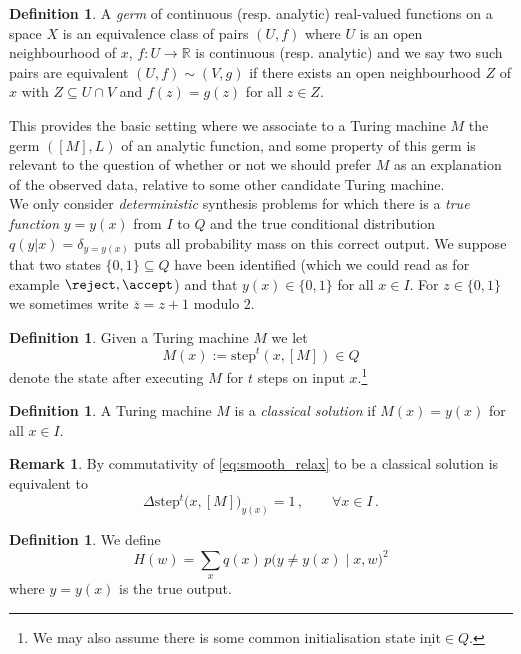 \documentclass[english,letter paper,12pt,reqno]{article}
\theoremstyle{definition}
\newtheorem{definition}[theorem]{Definition}
\newtheorem{remark}[theorem]{Remark}
\newcommand{\lto}{\longrightarrow}
\begin{document}
\begin{definition}\label{defn:germ}
A \emph{germ} of continuous (resp. analytic) real-valued functions on a space $X$ is an equivalence class of pairs $(U, f)$ where $U$ is an open neighbourhood of $x$, $f: U \lto \mathbb{R}$ is continuous (resp. analytic) and we say two such pairs are equivalent $(U, f) \sim (V, g)$ if there exists an open neighbourhood $Z$ of $x$ with $Z \subseteq U \cap V$ and $f(z) = g(z)$ for all $z \in Z$.
\end{definition}

This provides the basic setting where we associate to a Turing machine $M$ the germ $([M], L)$ of an analytic function, and some property of this germ is relevant to the question of whether or not we should prefer $M$ as an explanation of the observed data, relative to some other candidate Turing machine.
\\

We only consider \emph{deterministic} synthesis problems for which there is a \emph{true function} $y = y(x)$ from $I$ to $Q$ and the true conditional distribution $q(y|x) = \delta_{y = y(x)}$ puts all probability mass on this correct output. We suppose that two states $\{ 0, 1\} \subseteq Q$ have been identified (which we could read as for example $\reject, \accept$) and that $y(x) \in \{0,1\}$ for all $x \in I$. For $z \in \{0,1\}$ we sometimes write $\overline{z} = z + 1$ modulo $2$. 

\begin{definition}
Given a Turing machine $M$ we let
\[
M(x) := \textrm{step}^t(x,[M]) \in Q
\]
denote the state after executing $M$ for $t$ steps on input $x$.\footnote{We may also assume there is some common initialisation state $\underline{\text{init}} \in Q$.}
\end{definition}

\begin{definition} A Turing machine $M$ is a \emph{classical solution} if $M(x) = y(x)$ for all $x \in I$.
\end{definition}

\begin{remark} By commutativity of \eqref{eq:smooth_relax} to be a classical solution is equivalent to
\[
\Delta\textrm{step}^t\big(x,[M]\big)_{y(x)} = 1\,, \qquad \forall x \in I\,.
\]
\end{remark}

\begin{definition}\label{definition:polynomial_H} We define
\begin{equation}
H(w) = \sum_{x} q(x) \, p\big( y \neq y(x) \mid x, w\big)^2
\end{equation}
where $y = y(x)$ is the true output.
\end{definition}
\end{document}

